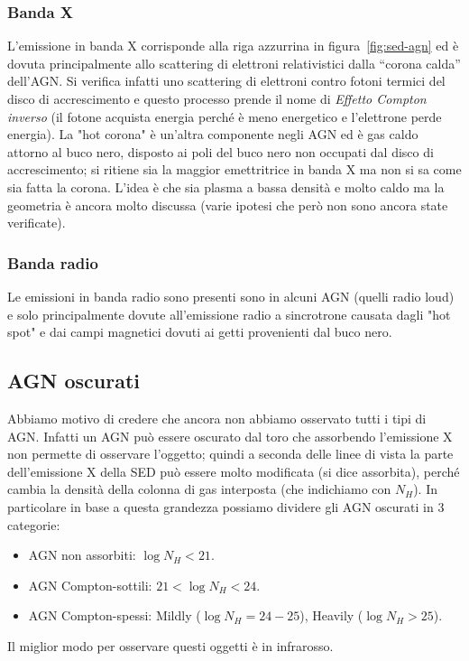  \subsubsection{Banda X}
L'emissione in banda X corrisponde alla riga azzurrina in figura~\ref{fig:sed-agn} ed è dovuta principalmente allo scattering di elettroni relativistici dalla “corona calda” dell'AGN. Si verifica infatti uno scattering di elettroni contro fotoni termici del disco di accrescimento e questo processo prende il nome di \emph{Effetto Compton inverso} (il fotone acquista energia perché è meno energetico e l'elettrone perde energia). La "hot corona" è un’altra componente negli AGN ed è gas caldo attorno al buco nero, disposto ai poli del buco nero non occupati dal disco di accrescimento; si ritiene sia la maggior emettritrice in banda X ma non si sa come sia fatta la corona. L’idea è che sia plasma a bassa densità e molto caldo ma la geometria è ancora molto discussa (varie ipotesi che però non sono ancora state verificate).

\subsubsection{Banda radio}
Le emissioni in banda radio sono presenti sono in alcuni AGN (quelli radio loud) e solo principalmente dovute all'emissione radio a sincrotrone causata dagli "hot spot" e dai campi magnetici dovuti ai getti provenienti dal buco nero.
 
\subsection{AGN oscurati}
Abbiamo motivo di credere che ancora non abbiamo osservato tutti i tipi di AGN. Infatti un AGN può essere oscurato dal toro che assorbendo l'emissione X non permette di osservare l'oggetto; quindi a seconda delle linee di vista la parte dell'emissione X della SED può essere molto modificata (si dice assorbita), perché cambia la densità della colonna di gas interposta (che indichiamo con $N_H$). In particolare in base a questa grandezza possiamo dividere gli AGN oscurati in 3 categorie:
\begin{itemize}
    \item AGN non assorbiti: $\log N_H < 21$.
    \item AGN Compton-sottili: $21 < \log N_H < 24$.
    \item AGN Compton-spessi: Mildly ($\log N_H = 24-25$), Heavily ($\log N_H > 25$).
\end{itemize}
Il miglior modo per osservare questi oggetti è in infrarosso. 

